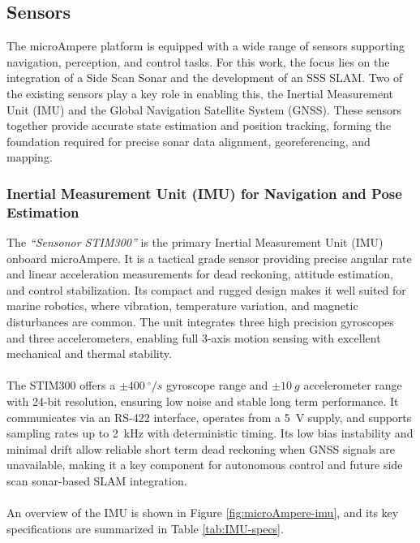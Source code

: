 \subsection{Sensors}
The microAmpere platform is equipped with a wide range of sensors supporting navigation, perception, and control tasks. For this work, the focus lies on the integration of a Side Scan Sonar and the development of an SSS SLAM. Two of the existing sensors play a key role in enabling this, the Inertial Measurement Unit (IMU) and the Global Navigation Satellite System (GNSS). These sensors together provide accurate state estimation and position tracking, forming the foundation required for precise sonar data alignment, georeferencing, and mapping.



\subsubsection{Inertial Measurement Unit (IMU) for Navigation and Pose Estimation}
\noindent
The \textit{``Sensonor STIM300''} is the primary Inertial Measurement Unit (IMU) onboard microAmpere. It is a tactical grade sensor providing precise angular rate and linear acceleration measurements for dead reckoning, attitude estimation, and control stabilization. Its compact and rugged design makes it well suited for marine robotics, where vibration, temperature variation, and magnetic disturbances are common. The unit integrates three high precision gyroscopes and three accelerometers, enabling full 3-axis motion sensing with excellent mechanical and thermal stability.
\\ \\
The STIM300 offers a $\pm400~^{\circ}/s$ gyroscope range and $\pm10~g$ accelerometer range with 24-bit resolution, ensuring low noise and stable long term performance. It communicates via an RS-422 interface, operates from a 5~V supply, and supports sampling rates up to 2~kHz with deterministic timing. Its low bias instability and minimal drift allow reliable short term dead reckoning when GNSS signals are unavailable, making it a key component for autonomous control and future side scan sonar-based SLAM integration.
\\ \\
An overview of the IMU is shown in Figure \ref{fig:microAmpere-imu}, and its key specifications are summarized in Table \ref{tab:IMU-specs}.
